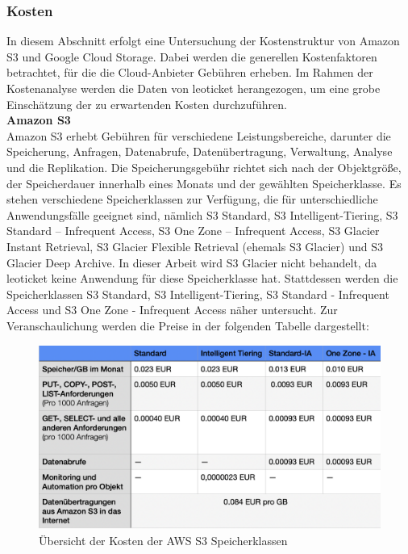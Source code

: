 \newpage

\subsubsection{Kosten}

In diesem Abschnitt erfolgt eine Untersuchung der Kostenstruktur von Amazon S3 und Google Cloud Storage. Dabei werden die generellen Kostenfaktoren betrachtet, für die die Cloud-Anbieter Gebühren erheben. Im Rahmen der Kostenanalyse werden die Daten von leoticket herangezogen, um eine grobe Einschätzung der zu erwartenden Kosten durchzuführen.\\

\textbf{Amazon S3}\\

Amazon S3 erhebt Gebühren für verschiedene Leistungsbereiche, darunter die Speicherung, Anfragen, Datenabrufe, Datenübertragung, Verwaltung, Analyse und die Replikation. Die Speicherungsgebühr richtet sich nach der Objektgröße, der Speicherdauer innerhalb eines Monats und der gewählten Speicherklasse. Es stehen verschiedene Speicherklassen zur Verfügung, die für unterschiedliche Anwendungsfälle geeignet sind, nämlich S3 Standard, S3 Intelligent-Tiering, S3 Standard – Infrequent Access, S3 One Zone – Infrequent Access, S3 Glacier Instant Retrieval, S3 Glacier Flexible Retrieval (ehemals S3 Glacier) und S3 Glacier Deep Archive. In dieser Arbeit wird S3 Glacier nicht behandelt, da leoticket keine Anwendung für diese Speicherklasse hat. Stattdessen werden die Speicherklassen S3 Standard, S3 Intelligent-Tiering, S3 Standard - Infrequent Access und S3 One Zone - Infrequent Access näher untersucht. Zur Veranschaulichung werden die Preise in der folgenden Tabelle dargestellt:

\begin{figure}[h]
	\centering
	\includegraphics[width=12cm,keepaspectratio]{Pictures/AllgKostenAWS.png}
	\caption{Übersicht der Kosten der AWS S3 Speicherklassen}
\end{figure}

